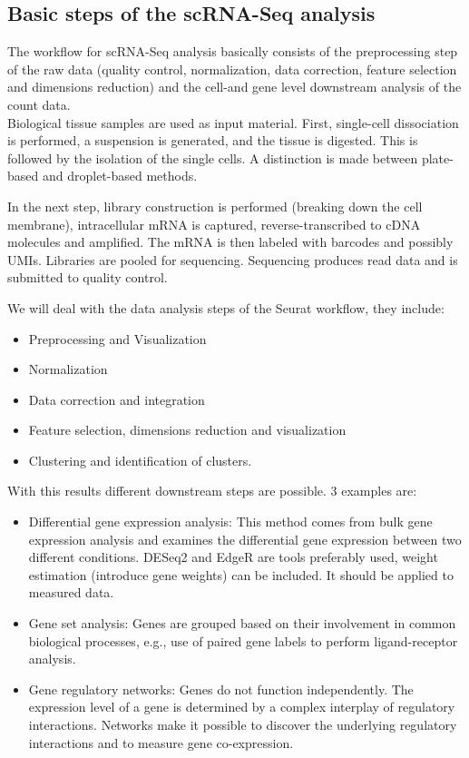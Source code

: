 \documentclass[a4paper, 10pt]{scrartcl}
\begin{document}
\hypertarget{basic-steps-of-the-scrna-seq-analysis}{%
\subsection{Basic steps of the scRNA-Seq
analysis}\label{basic-steps-of-the-scrna-seq-analysis}}

The workflow for scRNA-Seq analysis basically consists of the
preprocessing step of the raw data (quality control, normalization, data
correction, feature selection and dimensions reduction) and the cell-and
gene level downstream analysis of the count data.\\
Biological tissue samples are used as input material. First, single-cell
dissociation is performed, a suspension is generated, and the tissue is
digested. This is followed by the isolation of the single cells. A
distinction is made between plate-based and droplet-based methods.

In the next step, library construction is performed (breaking down the
cell membrane), intracellular mRNA is captured, reverse-transcribed to
cDNA molecules and amplified. The mRNA is then labeled with barcodes and
possibly UMIs. Libraries are pooled for sequencing. Sequencing produces
read data and is submitted to quality control.

We will deal with the data analysis steps of the Seurat workflow, they
include:

\begin{itemize}
\item
  Preprocessing and Visualization
\item
  Normalization
\item
  Data correction and integration
\item
  Feature selection, dimensions reduction and visualization
\item
  Clustering and identification of clusters.
\end{itemize}

With this results different downstream steps are possible. 3 examples
are:

\begin{itemize}
\item
  Differential gene expression analysis: This method comes from bulk
  gene expression analysis and examines the differential gene expression
  between two different conditions. DESeq2 and EdgeR are tools
  preferably used, weight estimation (introduce gene weights) can be
  included. It should be applied to measured data.
\item
  Gene set analysis: Genes are grouped based on their involvement in
  common biological processes, e.g., use of paired gene labels to
  perform ligand-receptor analysis.
\item
  Gene regulatory networks: Genes do not function independently. The
  expression level of a gene is determined by a complex interplay of
  regulatory interactions. Networks make it possible to discover the
  underlying regulatory interactions and to measure gene co-expression.
\end{itemize}
\end{document}
